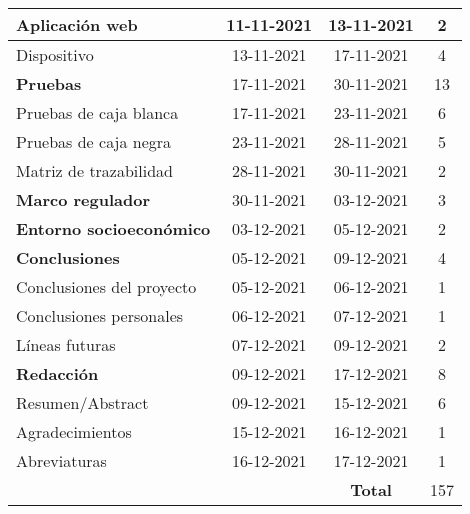 \begin{longtable}[c]{lcc|c|}
	\multicolumn{1}{|l|}{Aplicación web}                     & \multicolumn{1}{c|}{11-11-2021} & 13-11-2021     & 2   \\ \hline
	\multicolumn{1}{|l|}{Dispositivo}                        & \multicolumn{1}{c|}{13-11-2021} & 17-11-2021     & 4   \\ \hline
	\multicolumn{1}{|l|}{\textbf{Pruebas}}                   & \multicolumn{1}{c|}{17-11-2021} & 30-11-2021     & 13  \\ \hline
	\multicolumn{1}{|l|}{Pruebas de caja blanca}             & \multicolumn{1}{c|}{17-11-2021} & 23-11-2021     & 6   \\ \hline
	\multicolumn{1}{|l|}{Pruebas de caja negra}              & \multicolumn{1}{c|}{23-11-2021} & 28-11-2021     & 5   \\ \hline
	\multicolumn{1}{|l|}{Matriz de trazabilidad}             & \multicolumn{1}{c|}{28-11-2021} & 30-11-2021     & 2   \\ \hline
	\multicolumn{1}{|l|}{\textbf{Marco regulador}}           & \multicolumn{1}{c|}{30-11-2021} & 03-12-2021     & 3   \\ \hline
	\multicolumn{1}{|l|}{\textbf{Entorno socioeconómico}}    & \multicolumn{1}{c|}{03-12-2021} & 05-12-2021     & 2   \\ \hline
	\multicolumn{1}{|l|}{\textbf{Conclusiones}}              & \multicolumn{1}{c|}{05-12-2021} & 09-12-2021     & 4   \\ \hline
	\multicolumn{1}{|l|}{Conclusiones del proyecto}          & \multicolumn{1}{c|}{05-12-2021} & 06-12-2021     & 1   \\ \hline
	\multicolumn{1}{|l|}{Conclusiones personales}            & \multicolumn{1}{c|}{06-12-2021} & 07-12-2021     & 1   \\ \hline
	\multicolumn{1}{|l|}{Líneas futuras}                     & \multicolumn{1}{c|}{07-12-2021} & 09-12-2021     & 2   \\ \hline
	\multicolumn{1}{|l|}{\textbf{Redacción}}                 & \multicolumn{1}{c|}{09-12-2021} & 17-12-2021     & 8   \\ \hline
	\multicolumn{1}{|l|}{Resumen/Abstract}                   & \multicolumn{1}{c|}{09-12-2021} & 15-12-2021     & 6   \\ \hline
	\multicolumn{1}{|l|}{Agradecimientos}                    & \multicolumn{1}{c|}{15-12-2021} & 16-12-2021     & 1   \\ \hline
	\multicolumn{1}{|l|}{Abreviaturas}                       & \multicolumn{1}{c|}{16-12-2021} & 17-12-2021     & 1   \\ \hline
	                                                         &                                 & \textbf{Total} & 157 \\ \cline{4-4}
\end{longtable}
